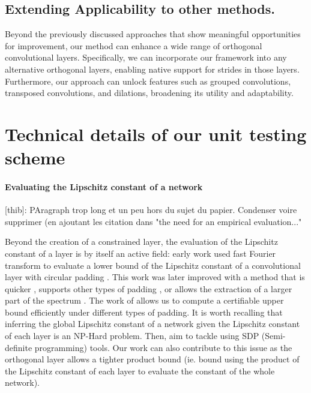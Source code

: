 \documentclass[10pt]{article}
\theoremstyle{plain}
\theoremstyle{definition}
\theoremstyle{remark}
\newcommand{\thib}[1]{{\color{blue}[thib]: #1}}
\newcommand{\thib}[1]{}
\newcommand{\Orthogonium}{ \href{https://github.com/deel-ai/orthogonium/}{Orthogonium }}
\begin{document}
    \subsection{Extending Applicability to other methods.} Beyond the previously discussed approaches that show meaningful opportunities for improvement, our method can enhance a wide range of orthogonal convolutional layers. Specifically, we can incorporate our framework into any alternative orthogonal layers, enabling native support for strides in those layers. Furthermore, our approach can unlock features such as grouped convolutions, transposed convolutions, and dilations, broadening its utility and adaptability.



\section{Technical details of our unit testing scheme} \label{ap:unit_testing}

    \paragraph{Evaluating the Lipschitz constant of a network}
    \thib{PAragraph trop long et un peu hors du sujet du papier. Condenser voire supprimer (en ajoutant les citation dans "the need for an empirical evaluation..."}

    Beyond the creation of a constrained layer, the evaluation of the Lipschitz constant of a layer is by itself an active field: early work used fast Fourier transform to evaluate a lower bound of the Lipschitz constant of a convolutional layer with circular padding \cite{sedghi_singular_2019}. This work was later improved with a method that is quicker \cite{senderovich_towards_2022}, supports other types of padding \cite{grishina_tight_2024}, or allows the extraction of a larger part of the spectrum \cite{boroojeny_spectrum_2024}. The work of \cite{delattre2023efficient} \cite{delattre2024spectral} allows us to compute a certifiable upper bound efficiently under different types of padding.
    It is worth recalling that inferring the global Lipschitz constant of a network given the Lipschitz constant of each layer is an NP-Hard problem\cite{virmaux2018lipschitz}. Then, \cite{pauli_lipschitz_2024,fazlyab_efficient_2019,wang2024scalability} aim to tackle using SDP (Semi-definite programming) tools. Our work can also contribute to this issue as the orthogonal layer allows a tighter product bound (ie. bound using the product of the Lipschitz constant of each layer to evaluate the constant of the whole network).
\end{document}
